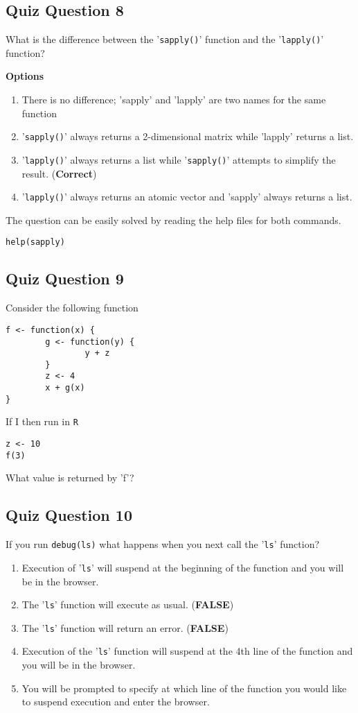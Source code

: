 \documentclass[12pt]{article}
\begin{document}
\newpage
\subsection{Quiz Question 8}
What is the difference between the '\texttt{sapply()}' function and the '\texttt{lapply()}' function?

\textbf{Options}
\begin{enumerate}
\item There is no difference; 'sapply' and 'lapply' are two names for the same function
\item '\texttt{sapply()}' always returns a 2-dimensional matrix while 'lapply' returns a list.
\item '\texttt{lapply()}' always returns a list while '\texttt{sapply()}' attempts to simplify the result. (\textbf{Correct})
\item '\texttt{lapply()}' always returns an atomic vector and 'sapply' always returns a list.
\end{enumerate}

\noindent The question can be easily solved by reading the help files for both commands.
\begin{verbatim}
help(sapply)
\end{verbatim}
\newpage
\subsection{Quiz Question 9}
Consider the following function
\begin{verbatim}
f <- function(x) {
        g <- function(y) {
                y + z
        }
        z <- 4
        x + g(x)
}
\end{verbatim}

If I then run in \texttt{R}
\begin{verbatim}
z <- 10
f(3)
\end{verbatim}
What value is returned by 'f'?

\newpage
\subsection*{Quiz Question 10}
If you run
\texttt{debug(ls)}
what happens when you next call the '\texttt{ls}' function?
\begin{enumerate}
\item Execution of '\texttt{ls}' will suspend at the beginning of the function and you will be in the browser.
\item The '\texttt{ls}' function will execute as usual. (\textbf{FALSE})
\item The '\texttt{ls}' function will return an error. (\textbf{FALSE})
\item Execution of the '\texttt{ls}' function will suspend at the 4th line of the function and you will be in the browser.
\item You will be prompted to specify at which line of the function you would like to suspend execution and enter the browser.
\end{enumerate}
\end{document}

